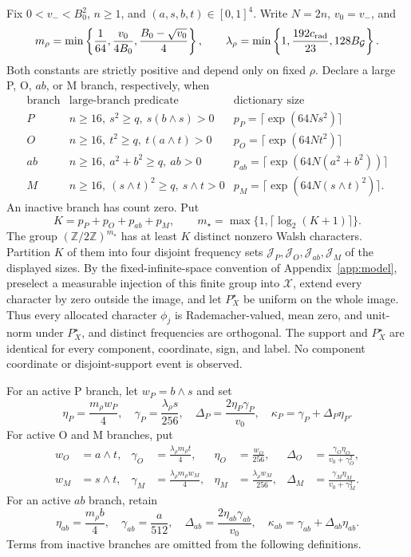 Fix \(0<v_-<B_0^2\), \(n\ge1\), and
\((a,s,b,t)\in[0,1]^4\).  Write \(N=2n\), \(v_0=v_-\), and
\[
 m_\rho=\min\left\{\frac1{64},\frac{v_0}{4B_0},
                \frac{B_0-\sqrt{v_0}}4\right\},\qquad
 \lambda_\rho=\min\left\{1,\frac{192c_{\rm rad}}{23},
                128B_{\mathcal G}\right\}.
\]
Both constants are strictly positive and depend only on fixed \(\rho\).
Declare a large P, O, \(ab\), or M branch, respectively, when
\[
\begin{array}{c|c|c}
\text{branch}&\text{large-branch predicate}&\text{dictionary size}\\ \hline
P&n\ge16,\ s^2\ge q,\ s(b\wedge s)>0&
 p_P=\lceil\exp(64Ns^2)\rceil\\
O&n\ge16,\ t^2\ge q,\ t(a\wedge t)>0&
 p_O=\lceil\exp(64Nt^2)\rceil\\
ab&n\ge16,\ a^2+b^2\ge q,\ ab>0&
 p_{ab}=\lceil\exp(64N(a^2+b^2))\rceil\\
M&n\ge16,\ (s\wedge t)^2\ge q,\ s\wedge t>0&
 p_M=\lceil\exp(64N(s\wedge t)^2)\rceil .
\end{array}
\]
An inactive branch has count zero.  Put
\[
 K=p_P+p_O+p_{ab}+p_M,\qquad
 m_\star=\max\{1,\lceil\log_2(K+1)\rceil\}.
\]
The group \((\mathbb Z/2\mathbb Z)^{m_\star}\) has at least \(K\)
distinct nonzero Walsh characters.  Partition \(K\) of them into four
disjoint frequency sets
\(\mathcal J_P,\mathcal J_O,\mathcal J_{ab},\mathcal J_M\) of the
displayed sizes.  By the fixed-infinite-space convention of
Appendix~\ref{app:model}, preselect a measurable injection of this finite
group into \(\mathcal X\), extend every character by zero outside the
image, and let \(P_X^\star\) be uniform on the whole image.  Thus every
allocated character \(\phi_j\) is Rademacher-valued, mean zero, and
unit-norm under \(P_X^\star\), and distinct frequencies are orthogonal.
The support and \(P_X^\star\) are identical for every component, coordinate,
sign, and label.  No component coordinate or disjoint-support event is
observed.

For an active P branch, let \(w_P=b\wedge s\) and set
\[
 \eta_P=\frac{m_\rho w_P}{4},\quad
 \gamma_P=\frac{\lambda_\rho s}{256},\quad
 \Delta_P=\frac{2\eta_P\gamma_P}{v_0},\quad
 \kappa_P=\gamma_P+\Delta_P\eta_P.
\]
For active O and M branches, put
\[
\begin{aligned}
 w_O&=a\wedge t,&
 \gamma_O&=\frac{\lambda_\rho m_\rho t}{4},&
 \eta_O&=\frac{w_O}{256},&
 \Delta_O&=\frac{\gamma_O\eta_O}{v_0+\gamma_O^2},\\
 w_M&=s\wedge t,&
 \gamma_M&=\frac{\lambda_\rho m_\rho w_M}{4},&
 \eta_M&=\frac{\lambda_\rho w_M}{256},&
 \Delta_M&=\frac{\gamma_M\eta_M}{v_0+\gamma_M^2}.
\end{aligned}
\]
For an active \(ab\) branch, retain
\[
 \eta_{ab}=\frac{m_\rho b}{4},\quad
 \gamma_{ab}=\frac{a}{512},\quad
 \Delta_{ab}=\frac{2\eta_{ab}\gamma_{ab}}{v_0},\quad
 \kappa_{ab}=\gamma_{ab}+\Delta_{ab}\eta_{ab}.
\]
Terms from inactive branches are omitted from the following definitions.

